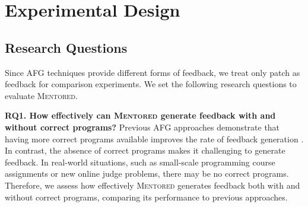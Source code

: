 \documentclass[10pt,conference]{IEEEtran}
\begin{document}
\section{Experimental Design}

    \subsection{Research Questions}
        Since AFG techniques provide different forms of feedback, we treat only patch as feedback for comparison experiments. We set the following research questions to evaluate \textsc{Mentored}.


        \textbf{RQ1. How effectively can \textsc{Mentored} generate feedback with and without correct programs?}
        Previous AFG approaches demonstrate that having more correct programs available improves the rate of feedback generation \cite{li2022generating, heo2023referent}. In contrast, the absence of correct programs makes it challenging to generate feedback. In real-world situations, such as small-scale programming course assignments or new online judge problems, there may be no correct programs. Therefore, we assess how effectively \textsc{Mentored} generates feedback both with and without correct programs, comparing its performance to previous approaches.
\end{document}
